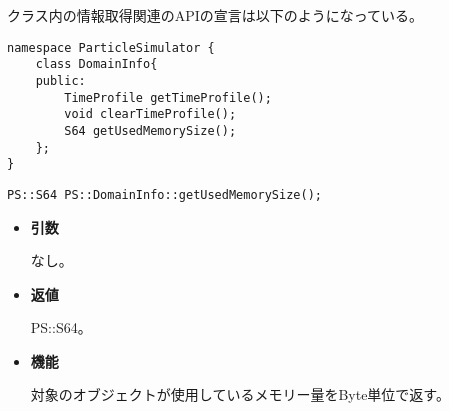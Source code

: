 
クラス内の情報取得関連のAPIの宣言は以下のようになっている。

\begin{lstlisting}[caption=DomainInfo3]
namespace ParticleSimulator {
    class DomainInfo{
    public:
        TimeProfile getTimeProfile();
        void clearTimeProfile();
        S64 getUsedMemorySize();
    };
}
\end{lstlisting}

\begin{screen}
\begin{verbatim}
PS::S64 PS::DomainInfo::getUsedMemorySize();
\end{verbatim}
\end{screen}

\begin{itemize}

\item {\bf 引数}

なし。

\item {\bf 返値}

PS::S64。

\item {\bf 機能}

対象のオブジェクトが使用しているメモリー量をByte単位で返す。

\end{itemize}




